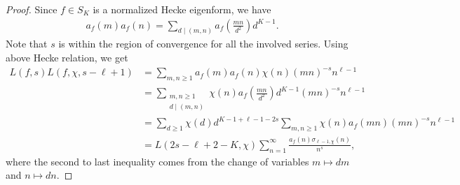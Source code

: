\documentclass[11pt,letterpaper,reqno]{amsart}
\newcommand\todo[1]{\textcolor{red}{\textbf{todo}: #1}}
\newcommand\ques[1]{\textcolor{blue}{\textbf{Question}: #1}}
\numberwithin{figure}{section}
\numberwithin{table}{section}
\theoremstyle{definition}
\theoremstyle{plain}
\theoremstyle{definition}
\theoremstyle{definition}
\theoremstyle{remark}
\numberwithin{equation}{section}
\theoremstyle{remark}
\begin{document}
\begin{proof}
    Since $f\in S_K$ is a normalized Hecke eigenform, we have 
    \begin{align*}
        a_f(m)a_f(n)=\sum_{d\mid(m,n)}a_f\left(\frac{mn}{d^2}\right)d^{K-1}.
    \end{align*}
Note that $s$ is within the region of convergence for all the involved series. Using above Hecke relation, we get
\begin{align}
    L(f,s)L(f,\chi,s-\ell+1)
    &=\sum_{m,n\geq1}a_f(m)a_f(n)\chi(n)(mn)^{-s}n^{\ell-1} \nonumber\\&=\sum\limits_{\substack{m,n\geq1\\d\mid(m,n)}}\chi(n)a_{f}\left(\frac{mn}{d^2}\right)d^{K-1}(mn)^{-s}n^{\ell-1} \nonumber\\&=\sum_{d\geq1}\chi(d)d^{K-1+\ell-1-2s}\sum_{m,n\geq1}\chi(n)a_{f}(mn)(mn)^{-s}n^{\ell-1} \nonumber\\&=L(2s-\ell+2-K,\chi)\sum_{n=1}^{\infty}\frac{a_{f}(n)\sigma_{\ell-1,\chi}(n)}{n^s}, \nonumber
\end{align}
where the second to last inequality comes from the change of variables $m\mapsto dm$ and $n\mapsto dn$.
\end{proof}
\end{document}
